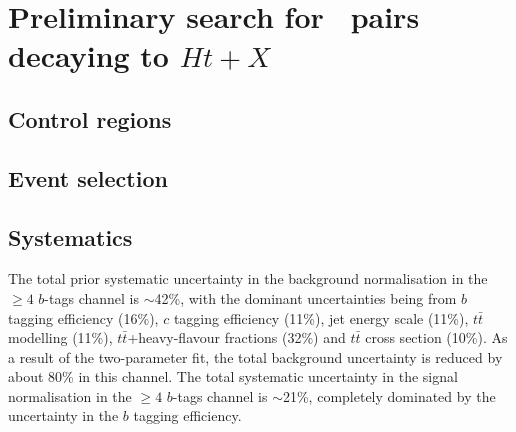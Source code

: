 \clearpage{\pagestyle{empty}\cleardoublepage}

\chapter{Preliminary search  for \TTbar\ pairs decaying to $Ht+X$}\label{chap:htx}

\section{Control regions}\label{sec:htxCR}

\section{Event selection}\label{sec:htxEVT}



\section{Systematics}\label{sec:htxSYS}



The total prior systematic uncertainty
in the background normalisation in the $\geq 4$ $b$-tags channel is 
$\sim$42\%, with the dominant uncertainties being from $b$ tagging efficiency (16\%),
$c$ tagging efficiency (11\%), jet energy scale (11\%), $t\bar{t}$ modelling (11\%), 
$t\bar{t}$+heavy-flavour fractions (32\%) and $t\bar{t}$ cross section (10\%).
As a result of the two-parameter fit, the total background uncertainty is reduced 
by about 80\% in this channel. The total  systematic uncertainty
in the signal normalisation in the $\geq 4$ $b$-tags channel is 
$\sim$21\%, completely dominated by the uncertainty in the $b$ tagging efficiency.
